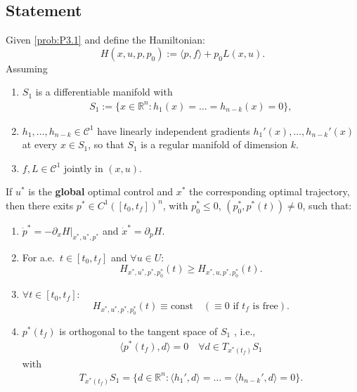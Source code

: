 \subsection{Statement}
\begin{theorem}
Given \eqref{prob:P3.1} and define the Hamiltonian:
\begin{equation}
	H(x, u, p, p_0):= \langle p, f \rangle + p_0 L(x, u). 
\end{equation}
Assuming
\begin{enumerate}
	\item $S_1$ is a differentiable manifold with 
	\begin{align*}
		S_1:= \{x \in \mathbb{R}^n: h_1(x) = \dots = h_{n - k}(x) = 0\},
	\end{align*}
	\item $h_1, \dots, h_{n-k} \in \mathcal{C}^1$ have linearly independent gradients $h_1'(x), \dots, h_{n-k}'(x)$ at every $x \in S_1$, so that $S_1$ is a regular manifold of dimension $k$.
		\item $f, L \in \mathcal{C}^1$ jointly in $(x, u)$.
\end{enumerate}
If $u^*$ is the \textbf{global} optimal control and $x^*$ the corresponding optimal trajectory, then there exits $p^* \in C^1([t_0, t_f])^n$, with $p_0^* \le  0$,  $(p^*_0, p^*(t)) \neq 0$,  such that:
\begin{enumerate}
	\item $\dot{p}^* = - \partial_x H|_{x^*, u^*, p^*}$ and $\dot{x}^* = \partial_p H$. 
	\item For a.e.\ $t \in [t_0, t_f]$ and $\forall u \in U$:
	\begin{equation}
		H_{x^*, u^*, p^*, p_0^*}(t) \ge H_{x^*, u, p^*, p_0^*}(t). 
	\end{equation}
	\item $\forall t \in [t_0, t_f]:$
	\begin{equation}
		H_{x^*, u^*, p^*, p_0^*}(t) \equiv \mathrm{const} \quad (\equiv 0 \text{ if } t_f \text{ is free}).
	\end{equation}
	\item $p^*(t_f)$ is orthogonal to the tangent space of $S_1$ , i.e., 
	\begin{align*}
		\langle p^*(t_f), d \rangle = 0 \quad \forall d \in T_{x^*(t_f)}S_1
	\end{align*}
	with 
	\begin{align*}
		T_{x^*(t_f)}S_1 = \{ d \in \mathbb{R}^n: \langle h_1',  d \rangle = \dots = \langle h_{n - k}', d \rangle = 0 \}. 
	\end{align*}
\end{enumerate}
\end{theorem}

